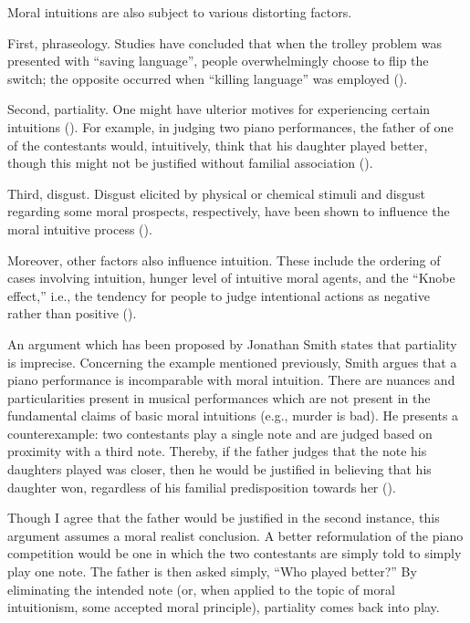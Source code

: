 \documentclass[12pt, a4paper, twoside]{article}
\begin{document}
Moral intuitions are also subject to various distorting factors.  

First, phraseology. Studies have concluded that when the trolley problem was presented with “saving language”, people overwhelmingly choose to flip the switch; the opposite occurred when “killing language” was employed (\cite[p.\ 6]{bengson2013experimental}).

Second, partiality. One might have ulterior motives for experiencing certain intuitions (\cite[pp.\ 343–346]{sinnott2006moral}). For example, in judging two piano performances, the father of one of the contestants would, intuitively, think that his daughter played better, though this might not be justified without familial association (\cite[p.\ 343]{sinnott2006moral}).

Third, disgust. Disgust elicited by physical or chemical stimuli and disgust regarding some moral prospects, respectively, have been shown to influence the moral intuitive process (\cite[p.\ 8]{tao2022effects}).

Moreover, other factors also influence intuition. These include the ordering of cases involving intuition, hunger level of intuitive moral agents, and the “Knobe effect,” i.e., the tendency for people to judge intentional actions as negative rather than positive (\cites{swain2008instability}[p.\ 1]{danziger2011extraneous}).

An argument which has been proposed by Jonathan Smith states that partiality is imprecise. Concerning the example mentioned previously, Smith argues that a piano performance is incomparable with moral intuition. There are nuances and particularities present in musical performances which are not present in the fundamental claims of basic moral intuitions (e.g., murder is bad). He presents a counterexample: two contestants play a single note and are judged based on proximity with a third note. Thereby, if the father judges that the note his daughters played was closer, then he would be justified in believing that his daughter won, regardless of his familial predisposition towards her (\cite[p.\ 77]{smith2010sinnott}).

Though I agree that the father would be justified in the second instance, this argument assumes a moral realist conclusion. A better reformulation of the piano competition would be one in which the two contestants are simply told to simply play one note. The father is then asked simply, “Who played better?” By eliminating the intended note (or, when applied to the topic of moral intuitionism, some accepted moral principle), partiality comes back into play. 
\end{document}
